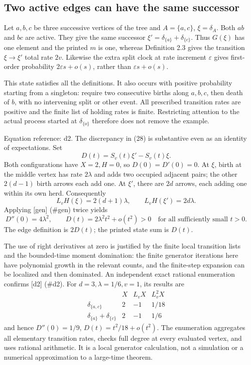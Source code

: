 \documentclass[10pt]{article}
\begin{document}
\subsection*{Two active edges can have the same successor}
Let \(a,b,c\) be three successive vertices of the tree and \(A=\{a,c\}\), \(\xi=\delta_A\). Both \(ab\) and \(bc\) are active. They give the same successor \(\xi'=\delta_{\{a\}}+\delta_{\{c\}}\). Thus \(G(\xi)\) has one element and the printed \(m\) is one, whereas Definition 2.3 gives the transition \(\xi\to\xi'\) total rate \(2v\). Likewise the extra split clock at rate increment \(\varepsilon\) gives first-order probability \(2\varepsilon s+o(s)\), rather than \(\varepsilon s+o(s)\).\par
This state satisfies all the definitions. It also occurs with positive probability starting from a singleton: require two consecutive births along \(a,b,c\), then death of \(b\), with no intervening split or other event. All prescribed transition rates are positive and the finite list of holding rates is finite. Restricting attention to the actual process started at \(\delta_{\{o\}}\) therefore does not remove the example.\par
Equation reference: d2. The discrepancy in (28) is substantive even as an identity of expectations. Set \[D(t)=S_v(t)\xi'-S_v(t)\xi.\] Both configurations have \(X=2,H=0\), so \(D(0)=D'(0)=0\). At \(\xi\), birth at the middle vertex has rate \(2\lambda\) and adds two occupied adjacent pairs; the other \(2(d-1)\) birth arrows each add one. At \(\xi'\), there are \(2d\) arrows, each adding one within its own herd. Consequently \[L_vH(\xi)=2(d+1)\lambda,\qquad L_vH(\xi')=2d\lambda .\] Applying [gen] (\#gen) twice yields \[
 D''(0)=4\lambda^2,\qquad
 D(t)=2\lambda^2t^2+o(t^2)>0
 \quad\text{for all sufficiently small }t>0.\] The edge definition is \(2D(t)\); the printed state sum is \(D(t)\).\par
The use of right derivatives at zero is justified by the finite local transition lists and the bounded-time moment domination: the finite generator iterations here have polynomial growth in the relevant counts, and the finite-step expansion can be localized and then dominated. An independent exact rational enumeration confirms [d2] (\#d2). For \(d=3,\lambda=1/6,v=1\), its results are \[\begin{array}{c|rrr}
 &X&L_vX&L_v^2X\\ \hline
 \delta_{\{a,c\}}&2&-1&1/18\\
 \delta_{\{a\}}+\delta_{\{c\}}&2&-1&1/6
\end{array}\] and hence \(D''(0)=1/9\), \(D(t)=t^2/18+o(t^2)\). The enumeration aggregates all elementary transition rates, checks full degree at every evaluated vertex, and uses rational arithmetic. It is a local generator calculation, not a simulation or a numerical approximation to a large-time theorem.\par
\end{document}
